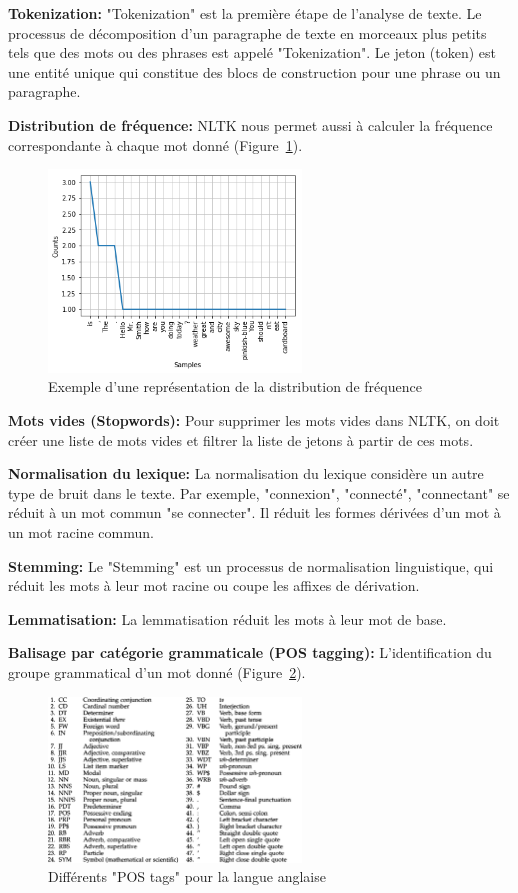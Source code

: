 \textbf{Tokenization:}
"Tokenization" est la première étape de l'analyse de texte. Le processus de décomposition d'un paragraphe de texte en morceaux plus petits tels que des mots ou des phrases est appelé "Tokenization". Le jeton (token) est une entité unique qui constitue des blocs de construction pour une phrase ou un paragraphe.

\textbf{Distribution de fréquence:}
NLTK nous permet aussi à calculer la fréquence correspondante à chaque mot donné (Figure~\ref{fig:frequencywordsntlk}).
\begin{figure}[H]
    \centering
    \includegraphics[width=0.6\textwidth]{realisation/assets/nltk-freq.png}
    \caption{Exemple d'une représentation de la distribution de fréquence}
    \label{fig:frequencywordsntlk}
\end{figure}

\textbf{Mots vides (Stopwords):}
Pour supprimer les mots vides dans NLTK, on doit créer une liste de mots vides et filtrer la liste de jetons à partir de ces mots.

\textbf{Normalisation du lexique:}
La normalisation du lexique considère un autre type de bruit dans le texte. Par exemple, "connexion", "connecté", "connectant" se réduit à un mot commun "se connecter". Il réduit les formes dérivées d'un mot à un mot racine commun.

\textbf{Stemming:} Le "Stemming" est un processus de normalisation linguistique, qui réduit les mots à leur mot racine ou coupe les affixes de dérivation.

\textbf{Lemmatisation:} La lemmatisation réduit les mots à leur mot de base.

\textbf{Balisage par catégorie grammaticale (POS tagging):}
L'identification du groupe grammatical d'un mot donné (Figure~\ref{fig:postags}).
\begin{figure}
    \centering
    \includegraphics[width=0.6\textwidth]{realisation/assets/nltk-pos.png}
    \caption{Différents "POS tags" pour la langue anglaise}
    \label{fig:postags}
\end{figure}

